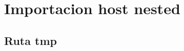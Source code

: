 \documentclass{report}
\begin{document}
\chapter{Importacion host nested}
\section{Ruta tmp}
\end{document}
